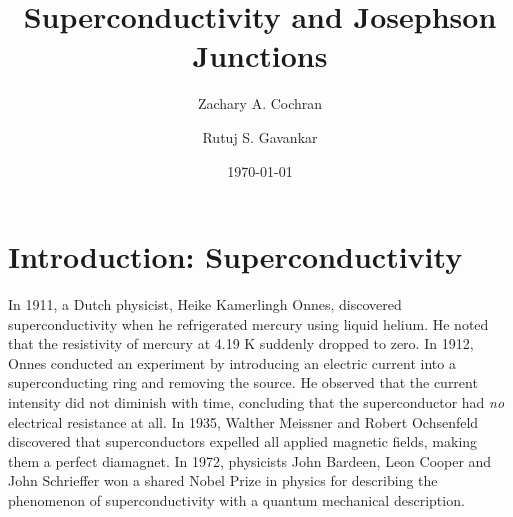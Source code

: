 \documentclass[letterpaper,english,reprint, aps]{revtex4-1}
\begin{document}

\title{Superconductivity and Josephson Junctions}

\author{Zachary A. Cochran}

\author{Rutuj S. Gavankar}  %

\date{\today}
\maketitle



\section{Introduction: Superconductivity} %
In 1911, a Dutch physicist, Heike Kamerlingh Onnes, discovered superconductivity when he refrigerated mercury using liquid helium. He noted that the resistivity of mercury at 4.19 \si{\kelvin} suddenly dropped to zero. In 1912, Onnes conducted an experiment by introducing an electric current into a superconducting ring and removing the source. He observed that the current intensity did not diminish with time, concluding that the superconductor had \emph{no} electrical resistance at all. In 1935, Walther Meissner and Robert Ochsenfeld discovered that superconductors expelled all applied magnetic fields, making them a perfect diamagnet. In 1972, physicists John Bardeen, Leon Cooper and John Schrieffer won a shared Nobel Prize in physics for describing the phenomenon of superconductivity with a quantum mechanical description.  
\end{document}
